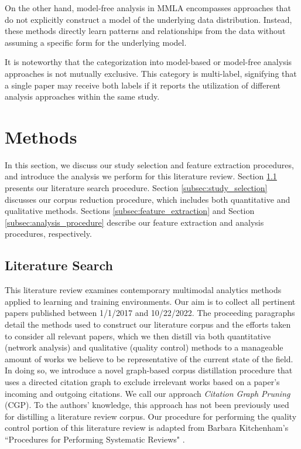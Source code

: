 \documentclass[manuscript,screen,review]{acmart}
\begin{document}
On the other hand, model-free analysis in MMLA encompasses approaches that do not explicitly construct a model of the underlying data distribution. Instead, these methods directly learn patterns and relationships from the data without assuming a specific form for the underlying model. 

It is noteworthy that the categorization into model-based or model-free analysis approaches is not mutually exclusive. This category is multi-label, signifying that a single paper may receive both labels if it reports the utilization of different analysis approaches within the same study. 

\section{Methods} \label{sec:methods}


In this section, we discuss our study selection and feature extraction procedures, and introduce the analysis we perform for this literature review. Section \ref{subsec:literature_search} presents our literature search procedure. Section \ref{subsec:study_selection} discusses our corpus reduction procedure, which includes both quantitative and qualitative methods. Sections \ref{subsec:feature_extraction} and Section \ref{subsec:analysis_procedure} describe our feature extraction and analysis procedures, respectively.

\subsection{Literature Search} \label{subsec:literature_search}

This literature review examines contemporary multimodal analytics methods applied to learning and training environments. Our aim is to collect all pertinent papers published between 1/1/2017 and 10/22/2022. The proceeding paragraphs detail the methods used to construct our literature corpus and the efforts taken to consider all relevant papers, which we then distill via both quantitative (network analysis) and qualitative (quality control) methods to a manageable amount of works we believe to be representative of the current state of the field. In doing so, we introduce a novel graph-based corpus distillation procedure that uses a directed citation graph to exclude irrelevant works based on a paper's incoming and outgoing citations. We call our approach \textit{Citation Graph Pruning} (CGP). To the authors' knowledge, this approach has not been previously used for distilling a literature review corpus. Our procedure for performing the quality control portion of this literature review is adapted from Barbara Kitchenham's ``Procedures for Performing Systematic Reviews" \cite{kitchenham2004procedures}.
\end{document}
